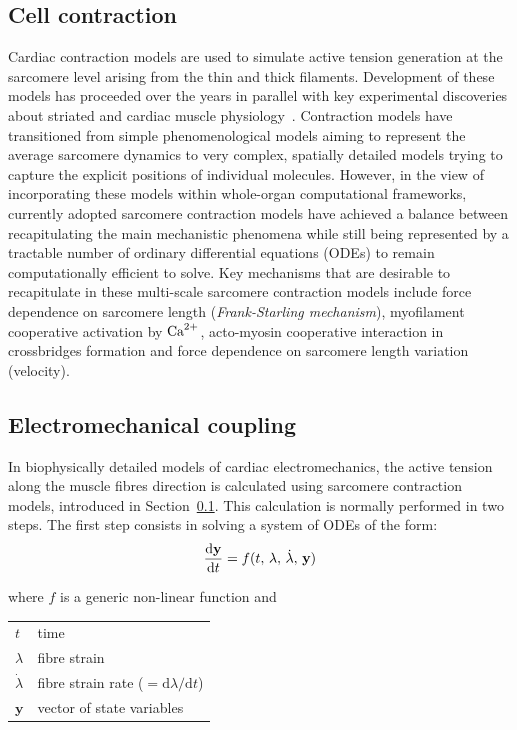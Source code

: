 \subsection{Cell contraction}\label{sec:cell_contr_modelling}
Cardiac contraction models are used to simulate active tension generation at the sarcomere level arising from the thin and thick filaments. Development of these models has proceeded over the years in parallel with key experimental discoveries about striated and cardiac muscle physiology~\cite{Niederer:2019}. Contraction models have transitioned from simple phenomenological models aiming to represent the average sarcomere dynamics to very complex, spatially detailed models trying to capture the explicit positions of individual molecules. However, in the view of incorporating these models within whole-organ computational frameworks, currently adopted sarcomere contraction models have achieved a balance between recapitulating the main mechanistic phenomena while still being represented by a tractable number of ordinary differential equations (\acs{ODE}s) to remain computationally efficient to solve. Key mechanisms that are desirable to recapitulate in these multi-scale sarcomere contraction models include force dependence on sarcomere length (\textit{Frank-Starling mechanism}), myofilament cooperative activation by $\textrm{Ca}^{2+}$, acto-myosin cooperative interaction in crossbridges formation and force dependence on sarcomere length variation (velocity).


%
%
%
\subsection{Electromechanical coupling}\label{sec:mathelecmechcoupl}
In biophysically detailed models of cardiac electromechanics, the active tension along the muscle fibres direction is calculated using sarcomere contraction models, introduced in Section~\ref{sec:cell_contr_modelling}. This calculation is normally performed in two steps. The first step consists in solving a system of ODEs of the form:
%
\begin{equation}\label{eq:epmechcoupling}
    \dfrac{\mathrm{d}{\mathbf{y}}}{\mathrm{d}{t}} = f(t,\,\lambda,\,\dot{\lambda},\,\mathbf{y}) 
\end{equation}

\noindent
where $f$ is a generic non-linear function and

\vspace{0.2cm}
\begin{tabular}{ll}
    $t$             & time \\
    $\lambda$       & fibre strain \\
    $\dot{\lambda}$ & fibre strain rate ($=\mathrm{d}\lambda / \mathrm{d}t$) \\
    $\mathbf{y}$    & vector of state variables
\end{tabular}

